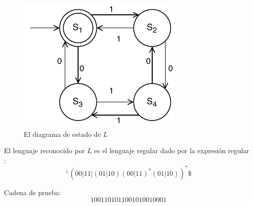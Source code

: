 \begin{figure}[H]
	\centering
	\includegraphics[width=0.4\linewidth]{doc/FiniteAutomaton/img/AFD}
	\caption{El diagrama de estado de $L$}
	\label{fig:AFD}
\end{figure}

El lenguaje reconocido por $L$ es el lenguaje regular dado por la expresión regular \cite{misc:Biegeleisen2015}: 
$$
^\wedge(00|11|(01|10)(00|11)^\ast(01|10))^\ast \$
$$

Cadena de prueba:
$$
1001101011001010010001
$$

